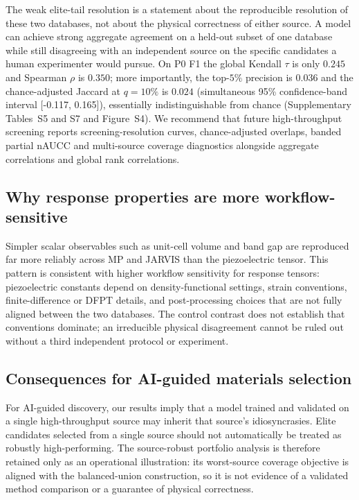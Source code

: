 \documentclass[11pt]{article}
\newcommand{\PZeroFOneClusterQTenCI}{[-0.117, 0.165]}
\begin{document}
The weak elite-tail resolution is a statement about the reproducible resolution of these two databases, not about the physical correctness of either source.
A model can achieve strong aggregate agreement on a held-out subset of one database while still disagreeing with an independent source on the specific candidates a human experimenter would pursue.
On P0 F1 the global Kendall $\tau$ is only $0.245$ and Spearman $\rho$ is $0.350$; more importantly, the top-$5\%$ precision is $0.036$ and the chance-adjusted Jaccard at $q=10\%$ is $0.024$ (simultaneous 95\% confidence-band interval \PZeroFOneClusterQTenCI{}), essentially indistinguishable from chance (Supplementary Tables~S5 and S7 and Figure~S4).
We recommend that future high-throughput screening reports screening-resolution curves, chance-adjusted overlaps, banded partial nAUCC and multi-source coverage diagnostics alongside aggregate correlations and global rank correlations.

\subsection{Why response properties are more workflow-sensitive}

Simpler scalar observables such as unit-cell volume and band gap are reproduced far more reliably across MP and JARVIS than the piezoelectric tensor.
This pattern is consistent with higher workflow sensitivity for response tensors: piezoelectric constants depend on density-functional settings, strain conventions, finite-difference or DFPT details, and post-processing choices that are not fully aligned between the two databases.
The control contrast does not establish that conventions dominate; an irreducible physical disagreement cannot be ruled out without a third independent protocol or experiment.

\subsection{Consequences for AI-guided materials selection}

For AI-guided discovery, our results imply that a model trained and validated on a single high-throughput source may inherit that source's idiosyncrasies.
Elite candidates selected from a single source should not automatically be treated as robustly high-performing.
The source-robust portfolio analysis is therefore retained only as an operational illustration: its worst-source coverage objective is aligned with the balanced-union construction, so it is not evidence of a validated method comparison or a guarantee of physical correctness.
\end{document}

